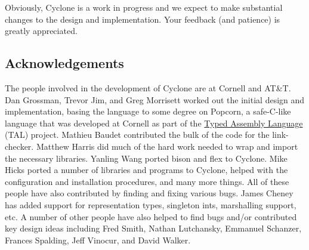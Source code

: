 Obviously, Cyclone is a work in progress and we expect to make
substantial changes to the design and implementation.  Your feedback
(and patience) is greatly appreciated.

\subsection{Acknowledgements}

The people involved in the development of Cyclone are at Cornell and
AT\&T\@.  Dan Grossman, Trevor Jim, and Greg Morrisett worked out the
initial design and implementation, basing the language to some degree
on Popcorn, a safe-C-like language that was developed at Cornell as
part of the
\href{http://www.cs.cornell.edu/talc}{Typed Assembly Language} (TAL)
project.  Mathieu Baudet contributed the bulk of the code for the
link-checker.  Matthew Harris did much of the hard work needed to
wrap and import the necessary libraries.  Yanling Wang ported bison and
flex to Cyclone.  Mike Hicks ported a number of libraries and programs
to Cyclone, helped with the configuration and installation procedures,
and many more things.  All of these people have also contributed by finding
and fixing various bugs.  James Cheney has added support for 
representation types, singleton ints, marshalling support, etc.
A number of other people have also helped
to find bugs and/or contributed key design ideas including 
Fred Smith, Nathan Lutchansky, Emmanuel Schanzer, Frances Spalding,
Jeff Vinocur, and David Walker.  

